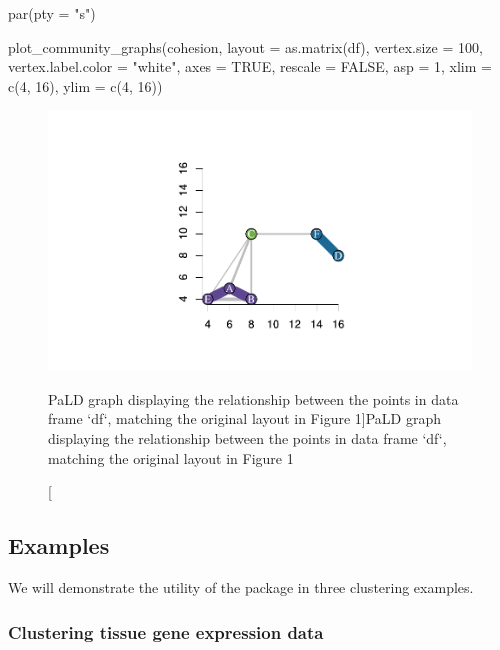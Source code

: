 \begin{Schunk}
\begin{Sinput}
par(pty = "s")

plot_community_graphs(cohesion, 
                      layout = as.matrix(df),
                      vertex.size = 100,
                      vertex.label.color = "white",
                      axes = TRUE,
                      rescale = FALSE,
                      asp = 1,
                      xlim = c(4, 16),
                      ylim = c(4, 16))
\end{Sinput}
\begin{figure}
\includegraphics{dagostino-mcgowan_files/figure-latex/fig3-1} \caption[PaLD graph displaying the relationship between the points in data frame `df`, matching the original layout in Figure 1]{PaLD graph displaying the relationship between the points in data frame `df`, matching the original layout in Figure 1}\label{fig:fig3}
\end{figure}
\end{Schunk}

\hypertarget{examples}{%
\subsection{Examples}\label{examples}}

We will demonstrate the utility of the  package in three
clustering examples.

\hypertarget{clustering-tissue-gene-expression-data}{%
\subsubsection{Clustering tissue gene expression
data}\label{clustering-tissue-gene-expression-data}}


